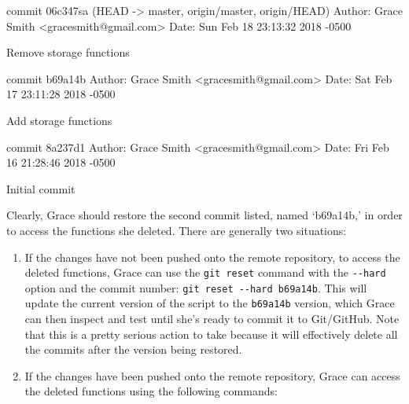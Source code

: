 \documentclass[
]{book}
\newenvironment{Shaded}{\begin{snugshade}}{\end{snugshade}}
\newcommand{\DecValTok}[1]{\textcolor[rgb]{0.00,0.00,0.81}{#1}}
\newcommand{\NormalTok}[1]{#1}
\newcommand{\OtherTok}[1]{\textcolor[rgb]{0.56,0.35,0.01}{#1}}
\newcommand{\SpecialCharTok}[1]{\textcolor[rgb]{0.00,0.00,0.00}{#1}}
\begin{document}
\begin{Shaded}
\begin{Highlighting}[]
\NormalTok{commit 06c347sa (HEAD }\OtherTok{{-}\textgreater{}}\NormalTok{ master, origin}\SpecialCharTok{/}\NormalTok{master, origin}\SpecialCharTok{/}\NormalTok{HEAD)}
\NormalTok{Author}\SpecialCharTok{:}\NormalTok{ Grace Smith }\SpecialCharTok{\textless{}}\NormalTok{gracesmith}\SpecialCharTok{@}\NormalTok{gmail.com}\SpecialCharTok{\textgreater{}}
\NormalTok{Date}\SpecialCharTok{:}\NormalTok{   Sun Feb }\DecValTok{18} \DecValTok{23}\SpecialCharTok{:}\DecValTok{13}\SpecialCharTok{:}\DecValTok{32} \DecValTok{2018} \SpecialCharTok{{-}}\DecValTok{0500}

\NormalTok{    Remove storage functions}

\NormalTok{commit b69a14b}
\NormalTok{Author}\SpecialCharTok{:}\NormalTok{ Grace Smith }\SpecialCharTok{\textless{}}\NormalTok{gracesmith}\SpecialCharTok{@}\NormalTok{gmail.com}\SpecialCharTok{\textgreater{}}
\NormalTok{Date}\SpecialCharTok{:}\NormalTok{   Sat Feb }\DecValTok{17} \DecValTok{23}\SpecialCharTok{:}\DecValTok{11}\SpecialCharTok{:}\DecValTok{28} \DecValTok{2018} \SpecialCharTok{{-}}\DecValTok{0500}

\NormalTok{    Add storage functions}

\NormalTok{commit 8a237d1}
\NormalTok{Author}\SpecialCharTok{:}\NormalTok{ Grace Smith }\SpecialCharTok{\textless{}}\NormalTok{gracesmith}\SpecialCharTok{@}\NormalTok{gmail.com}\SpecialCharTok{\textgreater{}}
\NormalTok{Date}\SpecialCharTok{:}\NormalTok{   Fri Feb }\DecValTok{16} \DecValTok{21}\SpecialCharTok{:}\DecValTok{28}\SpecialCharTok{:}\DecValTok{46} \DecValTok{2018} \SpecialCharTok{{-}}\DecValTok{0500}

\NormalTok{    Initial commit}
\end{Highlighting}
\end{Shaded}

Clearly, Grace should restore the second commit listed, named `b69a14b,' in order to access the functions she deleted. There are generally two situations:

\begin{enumerate}
\def\labelenumi{\arabic{enumi}.}
\item
  If the changes have not been pushed onto the remote repository, to access the deleted functions, Grace can use the \texttt{git\ reset} command with the \texttt{-\/-hard} option and the commit number: \texttt{git\ reset\ -\/-hard\ b69a14b}. This will update the current version of the script to the \texttt{b69a14b} version, which Grace can then inspect and test until she's ready to commit it to Git/GitHub. Note that this is a pretty serious action to take because it will effectively delete all the commits after the version being restored.
\item
  If the changes have been pushed onto the remote repository, Grace can access the deleted functions using the following commands:
\end{enumerate}
\end{document}
